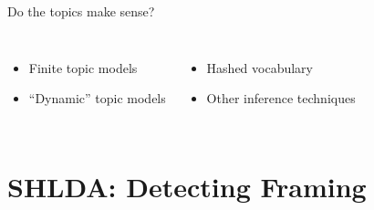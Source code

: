 \documentclass[compress]{beamer}
\begin{document}
\begin{frame}{Do the topics make sense?}
\begin{columns}
\begin{itemize}
  \item Finite topic models
  \item ``Dynamic'' topic models
\end{itemize}

\begin{itemize}
  \item Hashed vocabulary
  \item Other inference techniques
\end{itemize}
\end{columns}


\end{frame}



%


\section{SHLDA: Detecting Framing}

\providecommand{\shlda}{\textsc{ShLDA}}
\end{document}
